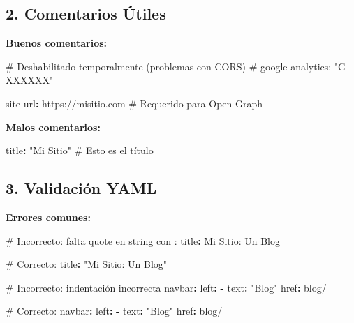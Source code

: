 \documentclass[
  doc,
  floatsintext,
  longtable,
  a4paper,
  nolmodern,
  notxfonts,
  notimes,
  12pt,
  colorlinks=true,linkcolor=blue,citecolor=blue,urlcolor=blue]{apa7}
\newenvironment{Shaded}{\begin{snugshade}}{\end{snugshade}}
\newcommand{\AttributeTok}[1]{\textcolor[rgb]{0.40,0.45,0.13}{#1}}
\newcommand{\CommentTok}[1]{\textcolor[rgb]{0.37,0.37,0.37}{#1}}
\newcommand{\FunctionTok}[1]{\textcolor[rgb]{0.28,0.35,0.67}{#1}}
\newcommand{\KeywordTok}[1]{\textcolor[rgb]{0.00,0.23,0.31}{\textbf{#1}}}
\newcommand{\StringTok}[1]{\textcolor[rgb]{0.13,0.47,0.30}{#1}}
\begin{document}
\subsection{2. Comentarios Útiles}\label{comentarios-uxfatiles}

\textbf{Buenos comentarios:}

\begin{Shaded}
\begin{Highlighting}[]
\CommentTok{\# Deshabilitado temporalmente (problemas con CORS)}
\CommentTok{\# google{-}analytics: "G{-}XXXXXX"}

\FunctionTok{site{-}url}\KeywordTok{:}\AttributeTok{ https://misitio.com}\CommentTok{    \# Requerido para Open Graph}
\end{Highlighting}
\end{Shaded}

\textbf{Malos comentarios:}

\begin{Shaded}
\begin{Highlighting}[]
\FunctionTok{title}\KeywordTok{:}\AttributeTok{ }\StringTok{"Mi Sitio"}\CommentTok{    \# Esto es el título}
\end{Highlighting}
\end{Shaded}

\subsection{3. Validación YAML}\label{validaciuxf3n-yaml}

\textbf{Errores comunes:}

\begin{Shaded}
\begin{Highlighting}[]
\CommentTok{\# Incorrecto: falta quote en string con \textquotesingle{}:\textquotesingle{}}
\FunctionTok{title}\KeywordTok{:}\AttributeTok{ Mi Sitio: Un Blog}

\CommentTok{\# Correcto:}
\FunctionTok{title}\KeywordTok{:}\AttributeTok{ }\StringTok{"Mi Sitio: Un Blog"}

\CommentTok{\# Incorrecto: indentación incorrecta}
\FunctionTok{navbar}\KeywordTok{:}
\FunctionTok{left}\KeywordTok{:}
\KeywordTok{{-}}\AttributeTok{ }\FunctionTok{text}\KeywordTok{:}\AttributeTok{ }\StringTok{"Blog"}
\AttributeTok{  }\FunctionTok{href}\KeywordTok{:}\AttributeTok{ blog/}

\CommentTok{\# Correcto:}
\FunctionTok{navbar}\KeywordTok{:}
\AttributeTok{  }\FunctionTok{left}\KeywordTok{:}
\AttributeTok{    }\KeywordTok{{-}}\AttributeTok{ }\FunctionTok{text}\KeywordTok{:}\AttributeTok{ }\StringTok{"Blog"}
\AttributeTok{      }\FunctionTok{href}\KeywordTok{:}\AttributeTok{ blog/}
\end{Highlighting}
\end{Shaded}
\end{document}
